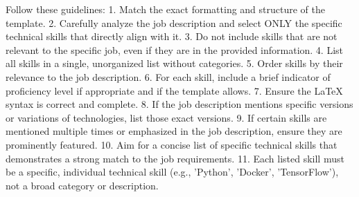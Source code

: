 \documentclass{resume}
\begin{document}
    Follow these guidelines:
    1. Match the exact formatting and structure of the template.
    2. Carefully analyze the job description and select ONLY the specific technical skills that directly align with it.
    3. Do not include skills that are not relevant to the specific job, even if they are in the provided information.
    4. List all skills in a single, unorganized list without categories.
    5. Order skills by their relevance to the job description.
    6. For each skill, include a brief indicator of proficiency level if appropriate and if the template allows.
    7. Ensure the LaTeX syntax is correct and complete.
    8. If the job description mentions specific versions or variations of technologies, list those exact versions.
    9. If certain skills are mentioned multiple times or emphasized in the job description, ensure they are prominently featured.
    10. Aim for a concise list of specific technical skills that demonstrates a strong match to the job requirements.
    11. Each listed skill must be a specific, individual technical skill (e.g., 'Python', 'Docker', 'TensorFlow'), not a broad category or description.
    
\end{document}

